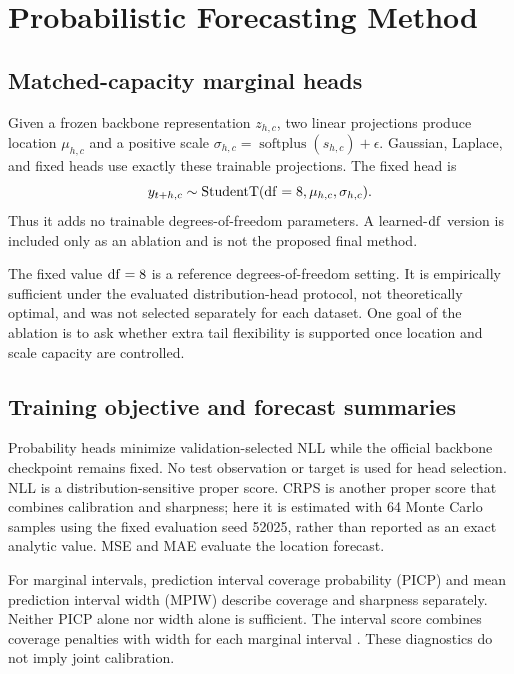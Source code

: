 \section{Probabilistic Forecasting Method}
\label{sec:method}

\subsection{Matched-capacity marginal heads}
Given a frozen backbone representation $z_{h,c}$, two linear projections produce location $\mu_{h,c}$ and a positive scale $\sigma_{h,c}=\operatorname{softplus}(s_{h,c})+\epsilon$. Gaussian, Laplace, and fixed \StudentT{} heads use exactly these trainable projections. The fixed head is
\begin{equation}
y_{t+h,c}\sim \operatorname{StudentT}(\mathrm{df}=8,\mu_{h,c},\sigma_{h,c}).
\label{eq:student-head}
\end{equation}
Thus it adds no trainable degrees-of-freedom parameters. A learned-$\mathrm{df}$ version is included only as an ablation and is not the proposed final method.

The fixed value $\mathrm{df}=8$ is a reference degrees-of-freedom setting. It is empirically sufficient under the evaluated distribution-head protocol, not theoretically optimal, and was not selected separately for each dataset. One goal of the ablation is to ask whether extra tail flexibility is supported once location and scale capacity are controlled.

\subsection{Training objective and forecast summaries}
Probability heads minimize validation-selected NLL while the official backbone checkpoint remains fixed. No test observation or target is used for head selection. NLL is a distribution-sensitive proper score. CRPS is another proper score that combines calibration and sharpness; here it is estimated with 64 Monte Carlo samples using the fixed evaluation seed 52025, rather than reported as an exact analytic value. MSE and MAE evaluate the location forecast.

For marginal intervals, prediction interval coverage probability (PICP) and mean prediction interval width (MPIW) describe coverage and sharpness separately. Neither PICP alone nor width alone is sufficient. The interval score combines coverage penalties with width for each marginal interval \citep{winkler1972interval}. These diagnostics do not imply joint calibration.
